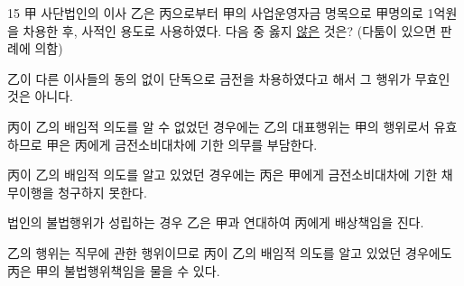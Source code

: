 \begin{question}{15}
甲 사단법인의 이사 乙은 丙으로부터 甲의 사업운영자금 명목으로 甲명의로 1억원을 차용한 후, 사적인 용도로 사용하였다. 다음 중 옳지 \uline{않은} 것은? (다툼이 있으면 판례에 의함)
\begin{choices}
  \item 乙이 다른 이사들의 동의 없이 단독으로 금전을 차용하였다고 해서 그 행위가 무효인 것은 아니다.
  \item 丙이 乙의 배임적 의도를 알 수 없었던 경우에는 乙의 대표행위는 甲의 행위로서 유효하므로 甲은 丙에게 금전소비대차에 기한 의무를 부담한다.
  \item 丙이 乙의 배임적 의도를 알고 있었던 경우에는 丙은 甲에게 금전소비대차에 기한 채무이행을 청구하지 못한다.
  \item 법인의 불법행위가 성립하는 경우 乙은 甲과 연대하여 丙에게 배상책임을 진다.
  \item 乙의 행위는 직무에 관한 행위이므로 丙이 乙의 배임적 의도를 알고 있었던 경우에도 丙은 甲의 불법행위책임을 물을 수 있다.
\end{choices}
\end{question}
